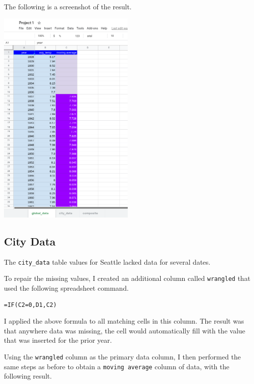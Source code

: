 \documentclass[12pt]{article}
\begin{document}
The following is a screenshot of the result.

\begin{center}
\includegraphics[width=0.5\textwidth]{global_data.png}
\end{center}

\pagebreak

\subsection{City Data}

The \lstinline{city_data} table values for Seattle lacked data for several dates. 

To repair the missing values, I created an additional column called \lstinline{wrangled} that used the following spreadsheet command.

\begin{verbatim}
=IF(C2=0,D1,C2)
\end{verbatim}

I applied the above formula to all matching cells in this column. The result was that anywhere data was missing, the cell would automatically fill with the value that was inserted for the prior year.

Using the \lstinline{wrangled} column as the primary data column, I then performed the same steps as before to obtain a \lstinline{moving average} column of data, with the following result.
\end{document}
